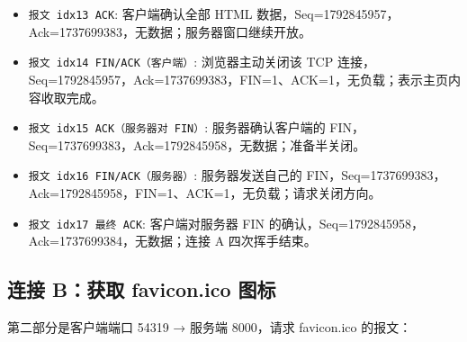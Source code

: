\documentclass[a4paper]{article}
\begin{document}
\begin{itemize}
		\item \texttt{报文 idx13 ACK}: 客户端确认全部 HTML 数据，Seq=1792845957，Ack=1737699383，无数据；服务器窗口继续开放。
		\item \texttt{报文 idx14 FIN/ACK（客户端）}: 浏览器主动关闭该 TCP 连接，Seq=1792845957，Ack=1737699383，FIN=1、ACK=1，无负载；表示主页内容收取完成。
		\item \texttt{报文 idx15 ACK（服务器对 FIN）}: 服务器确认客户端的 FIN，Seq=1737699383，Ack=1792845958，无数据；准备半关闭。
		\item \texttt{报文 idx16 FIN/ACK（服务器）}: 服务器发送自己的 FIN，Seq=1737699383，Ack=1792845958，FIN=1、ACK=1，无负载；请求关闭方向。
		\item \texttt{报文 idx17 最终 ACK}: 客户端对服务器 FIN 的确认，Seq=1792845958，Ack=1737699384，无数据；连接 A 四次挥手结束。
	\end{itemize}

	\subsection{连接 B：获取 favicon.ico 图标}
	第二部分是客户端端口 54319 → 服务端 8000，请求 favicon.ico 的报文：
\end{document}
